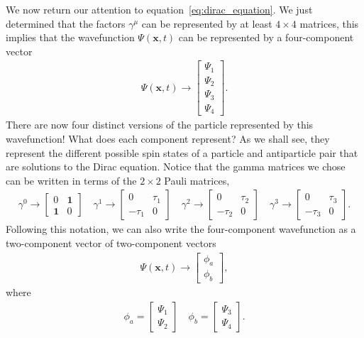\documentclass[titlepage,letterpaper,onecolumn,11pt,final]{report}
\newcommand{\psxt}{\Psi (\mathbf{x},t)}
\newcommand{\gama}{\gamma^{0}}
\newcommand{\gamb}{\gamma^{1}}
\newcommand{\gamc}{\gamma^{2}}
\newcommand{\gamd}{\gamma^{3}}
\numberwithin{equation}{section}
\numberwithin{figure}{section}
\begin{document}
We now return our attention to equation~\ref{eq:dirac_equation}. We just determined that the factors $\gamma^{\mu}$ can be represented by at least $4 \times 4$ matrices, this implies that the wavefunction $\psxt$ can be represented by a four-component vector
\begin{gather}
	\psxt \rightarrow
	\begin{bmatrix}
		\Psi_{1} \\
		\Psi_{2} \\
		\Psi_{3} \\
		\Psi_{4} 
	\end{bmatrix} .
\end{gather}
There are now four distinct versions of the particle represented by this wavefunction! What does each component represent? As we shall see, they represent the different possible spin states of a particle and antiparticle pair that are solutions to the Dirac equation. Notice that the gamma matrices we chose can be written in terms of the $2 \times 2$ Pauli matrices,
\begin{gather}
	\gama \rightarrow
	\begin{bmatrix}
		0 & \mathbf{1}   \\
		\mathbf{1} & 0  
	\end{bmatrix} \quad
	\gamb \rightarrow
	\begin{bmatrix}
		0 & \tau_{1}  \\
		-\tau_{1} & 0  
	\end{bmatrix} \quad
	\label{eq:dirac_matrices_pauli}
	\gamc \rightarrow
	\begin{bmatrix}
		0 & \tau_{2}  \\
		-\tau_{2} & 0  
	\end{bmatrix} \quad
	\gamd \rightarrow
	\begin{bmatrix}
		0 & \tau_{3}  \\
		-\tau_{3} & 0  
	\end{bmatrix}.
\end{gather}
Following this notation, we can also write the four-component wavefunction as a two-component vector of two-component vectors
\begin{gather}
	\psxt \rightarrow
	\begin{bmatrix}
		\phi_{a}\\
		\phi_{b}
	\end{bmatrix},
\end{gather}
where
\begin{gather}
	\phi_{a} =
	\begin{bmatrix}
		\Psi_{1}\\
		\Psi_{2}		
	\end{bmatrix} \quad
	\phi_{b} =
	\begin{bmatrix}
		\Psi_{3}\\
		\Psi_{4}		
	\end{bmatrix}.
\end{gather}
\end{document}
